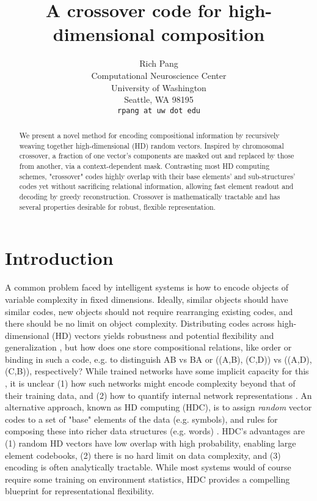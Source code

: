 \documentclass{article}
\title{A crossover code for high-dimensional composition}
\author{%
  Rich Pang\\
  Computational Neuroscience Center\\
  University of Washington\\
  Seattle, WA 98195\\
  \texttt{rpang at uw dot edu} \\
}
\begin{document}
\maketitle

\begin{abstract}
We present a novel method for encoding compositional information by recursively weaving together high-dimensional (HD) random vectors. Inspired by chromosomal crossover, a fraction of one vector's components are masked out and replaced by those from another, via a context-dependent mask. Contrasting most HD computing schemes, "crossover" codes highly overlap with their base elements' and sub-structures' codes yet without sacrificing relational information, allowing fast element readout and decoding by greedy reconstruction. Crossover is mathematically tractable and has several properties desirable for robust, flexible representation.
\end{abstract}

\section{Introduction}

A common problem faced by intelligent systems is how to encode objects of variable complexity in fixed dimensions. Ideally, similar objects should have similar codes, new objects should not require rearranging existing codes, and there should be no limit on object complexity. Distributing codes across high-dimensional (HD) vectors yields robustness and potential flexibility and generalization \cite{Hinton:1984, Mikolov:2013}, but how does one store compositional relations, like order or binding in such a code, e.g. to distinguish AB vs BA or ((A,B), (C,D)) vs ((A,D), (C,B)), respectively? While trained networks have some implicit capacity for this \cite{Bahdanau:2014, Luong:2015, Wu:2016}, it is unclear (1) how such networks might encode complexity beyond that of their training data, and (2) how to quantify internal network representations \cite{Lipton:2016}. An alternative approach, known as HD computing (HDC), is to assign \textit{random} vector codes to a set of "base" elements of the data (e.g. symbols), and rules for composing these into richer data structures (e.g. words) \cite{Plate:1995, Kanerva:2009, Gayler:2004}. HDC's advantages are (1) random HD vectors have low overlap with high probability, enabling large element codebooks, (2) there is no hard limit on data complexity, and (3) encoding is often analytically tractable. While most systems would of course require some training on environment statistics, HDC provides a compelling blueprint for representational flexibility.
\end{document}

